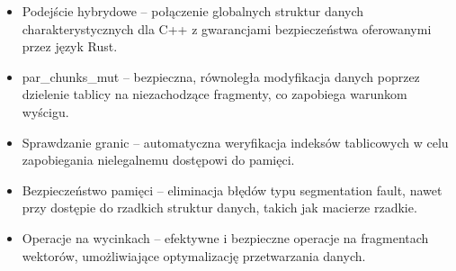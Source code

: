 \begin{itemize}
    \item Podejście hybrydowe – połączenie globalnych struktur danych charakterystycznych dla C++ z gwarancjami bezpieczeństwa oferowanymi przez język Rust.
    
    \item par\_chunks\_mut – bezpieczna, równoległa modyfikacja danych poprzez dzielenie tablicy na niezachodzące fragmenty, co zapobiega warunkom wyścigu.
    
    \item Sprawdzanie granic – automatyczna weryfikacja indeksów tablicowych w celu zapobiegania nielegalnemu dostępowi do pamięci.
    
    \item Bezpieczeństwo pamięci – eliminacja błędów typu segmentation fault, nawet przy dostępie do rzadkich struktur danych, takich jak macierze rzadkie.
    
    \item Operacje na wycinkach  – efektywne i bezpieczne operacje na fragmentach wektorów, umożliwiające optymalizację przetwarzania danych.
  \end{itemize}
  
